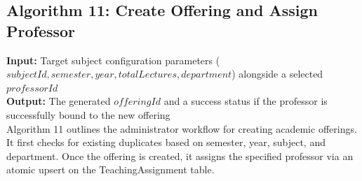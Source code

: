 
\subsection{Algorithm 11: Create Offering and Assign Professor}

\textbf{Input:} Target subject configuration parameters ($subjectId, semester, year, totalLectures, department$) alongside a selected $professorId$  \\
\textbf{Output:} The generated $offeringId$ and a success status if the professor is successfully bound to the new offering \\

Algorithm 11 outlines the administrator workflow for creating academic offerings. It first checks for existing duplicates based on semester, year, subject, and department. Once the offering is created, it assigns the specified professor via an atomic upsert on the TeachingAssignment table.

